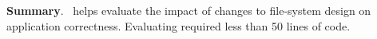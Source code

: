 
\textbf{Summary}. \toolname\ helps evaluate the impact of changes to
file-system design on application correctness. Evaluating
 required less than 50 lines of code. 
